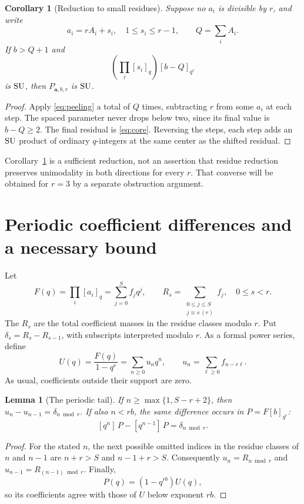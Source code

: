 \documentclass[11pt]{article}
\theoremstyle{research}
\newtheorem{lemma}[theorem]{Lemma}
\newtheorem{corollary}[theorem]{Corollary}
\theoremstyle{definition}
\newcommand{\qi}[1]{[#1]_q}
\newcommand{\qir}[2]{[#1]_{q^{#2}}}
\newcommand{\coef}[2]{[q^{#1}]\,#2}
\newcommand{\SU}{\textup{SU}}
\numberwithin{equation}{section}
\begin{document}
\begin{corollary}[Reduction to small residues]\label{cor:core}
Suppose no $a_i$ is divisible by $r$, and write
\[
 a_i=rA_i+s_i,\quad 1\le s_i\le r-1,\qquad Q=\sum_i A_i.
\]
If $b>Q+1$ and
\begin{equation}\label{eq:core}
 \left(\prod_i\qi{s_i}\right)\qir{b-Q}{r}
\end{equation}
is $\SU$, then $P_{\boldsymbol a,b,r}$ is $\SU$.
\end{corollary}
\begin{proof}
Apply \eqref{eq:peeling} a total of $Q$ times, subtracting $r$ from
some $a_i$ at each step. The spaced parameter never drops below two,
since its final value is $b-Q\ge2$. The final residual is
\eqref{eq:core}. Reversing the steps, each step adds an $\SU$ product of
ordinary $q$-integers at the same center as the shifted residual.
\end{proof}

Corollary~\ref{cor:core} is a sufficient reduction, not an assertion that
residue reduction preserves unimodality in both directions for every $r$.
That converse will be obtained for $r=3$ by a separate obstruction argument.

\section{Periodic coefficient differences and a necessary bound}
\label{sec:residues}
Let
\[
 F(q)=\prod_i\qi{a_i}=\sum_{j=0}^S f_jq^j,
 \qquad R_s=\sum_{\substack{0\le j\le S\\j\equiv s\ (r)}}f_j,
 \quad 0\le s<r.
\]
The $R_s$ are the total coefficient masses in the residue classes modulo
$r$. Put $\delta_s=R_s-R_{s-1}$, with subscripts interpreted modulo $r$.
As a formal power series, define
\begin{equation}\label{eq:u-general}
 U(q)=\frac{F(q)}{1-q^r}=\sum_{n\ge0}u_nq^n,
 \qquad u_n=\sum_{\ell\ge0}f_{n-r\ell}.
\end{equation}
As usual, coefficients outside their support are zero.

\begin{lemma}[The periodic tail]\label{lem:tail}
If $n\ge\max\{1,S-r+2\}$, then
$u_n-u_{n-1}=\delta_{n\bmod r}$.
If also $n<rb$, the same difference occurs in
$P=F\qir b r$:
\begin{equation}\label{eq:taildiff}
 \coef nP-\coef{n-1}P=\delta_{n\bmod r}.
\end{equation}
\end{lemma}
\begin{proof}
For the stated $n$, the next possible omitted indices in the residue
classes of $n$ and $n-1$ are $n+r>S$ and $n-1+r>S$.
Consequently $u_n=R_{n\bmod r}$ and $u_{n-1}=R_{(n-1)\bmod r}$.
Finally,
\[
 P(q)=(1-q^{rb})U(q),
\]
so its coefficients agree with those of $U$ below exponent $rb$.
\end{proof}
\end{document}
